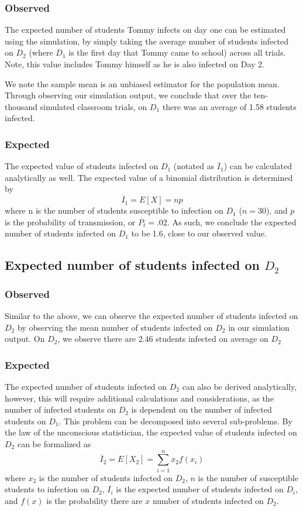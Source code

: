 \documentclass[
	letterpaper, %
]{jdf}
\begin{document}
\subsubsection{Observed}
The expected number of students Tommy infects on day one can be estimated using the simulation, by simply taking the average number of students infected on \(D_2\) (where \(D_1\) is the first day that Tommy came to school) across all trials. Note, this value includes Tommy himself as he is also infected on Day 2.

 We note the sample mean is an unbiased estimator for the population mean. \citep{goldsman2020} Through observing our simulation output, we conclude that over the ten-thousand simulated classroom trials, on \(D_1\) there was an average of 1.58 students infected. 

\subsubsection{Expected}
The expected value of students infected on \(D_1\) (notated as \(\overline{I}_1\)) can be calculated analytically as well. The expected value of a binomial distribution is determined by \[\overline{I}_1 = E[X]=np\] where n is the number of students susceptible to infection on \(D_1\) (\(n=30\)), and \(p\) is the probability of transmission, or \(P_{t}=.02\). As such, we conclude the expected number of students infected on \(D_1\) to be 1.6, close to our observed value. \citep{goldsman2020}

\subsection{Expected number of students infected on \(D_2\)}
\subsubsection{Observed}
Similar to the above, we can observe the expected number of students infected on \(D_2\) by observing the mean number of students infected on \(D_2\) in our simulation output. On \(D_2\), we observe there are 2.46 students infected on average on \(D_2\)

\subsubsection{Expected}
The expected number of students infected on \(D_2\) can also be derived analytically, however, this will require additional calculations and considerations, as the number of infected students on \(D_2\) is dependent on the number of infected students on \(D_1\). This problem can be decomposed into several sub-problems. By the law of the unconscious statistician, the expected value of students infected on \(D_2\) can be formalized as 
\[\overline{I}_2 = E[X_2]= \sum_{i=1}^{n}x_2f(x_i)\]
where \(x_2\) is the number of students infected on \(D_2\), \(n\) is the number of susceptible students to infection on \(D_2\), \(\overline{I_i}\) is the expected number of students infected on \(D_i\), and \(f(x)\) is the probability there are \(x\) number of students infected on \(D_2\). 
\end{document}

